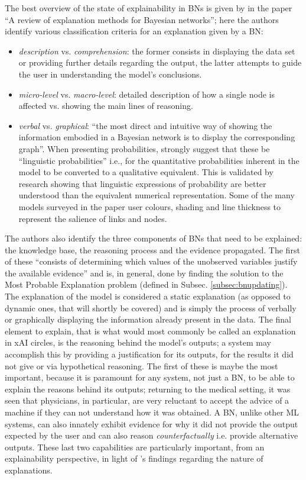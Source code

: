The best overview of the state of explainability in BNs is given by \cite{lacave2002review} in the paper \enquote{A review of explanation methods for Bayesian networks}; here the authors identify various classification criteria for an explanation given by a BN:
\begin{itemize}
  \item \textit{description} vs. \textit{comprehension}: the former consists in displaying the data set or providing further details regarding the output, the latter attempts to guide the user in understanding the model's conclusions.
  \item \textit{micro-level} vs. \textit{macro-level}: detailed description of how a single node is affected vs. showing the main lines of reasoning.
  \item \textit{verbal} vs. \textit{graphical}: \enquote{the most direct and intuitive way of showing the information embodied in a Bayesian network is to display the corresponding graph}.
  When presenting probabilities, \cite{henrion1990qualtitative} strongly suggest that these be \enquote{linguistic probabilities} i.e., for the quantitative probabilities inherent in the model to be converted to a qualitative equivalent.
  This is validated by research showing that linguistic expressions of probability are better understood than the equivalent numerical representation. 
  Some of the many models surveyed in the paper user colours, shading and line thickness to represent the salience of links and nodes.
\end{itemize}
The authors also identify the three components of BNs that need to be explained: the knowledge base, the reasoning process and the evidence propagated.
The first of these \enquote{consists of determining which values of the unobserved variables justify the available evidence} and is, in general, done by finding the solution to the Most Probable Explanation problem (defined in Subsec. \ref{subsec:bnupdating}).
The explanation of the model is considered a static explanation (as opposed to dynamic ones, that will shortly be covered) and is simply the process of verbally or graphically displaying the information already present in the data.
The final element to explain, that is what would most commonly be called an explanation in xAI circles, is the reasoning behind the model's outputs; a system may accomplish this by providing a justification for its outputs, for the results it did not give or via hypothetical reasoning.
The first of these is maybe the most important, because it is paramount for any system, not just a BN, to be able to explain the reasons behind its outputs; returning to the medical setting, it was seen that physicians, in particular, are very reluctant to accept the advice of a machine if they can not understand how it was obtained.
A BN, unlike other ML systems, can also innately exhibit evidence for why it did not provide the output expected by the user and can also reason \textit{counterfactually} i.e. provide alternative outputs.
These last two capabilities are particularly important, from an explainability perspective, in light of \cite{miller2018explanation}'s findings regarding the nature of explanations.

